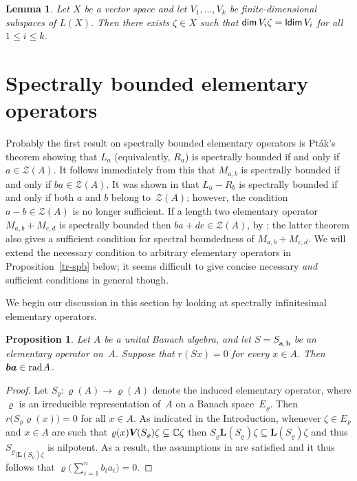 \documentclass[a4paper,12pt,reqno]{amsart}
\numberwithin{equation}{section}
\newtheorem{prop}[thm]{Proposition}
\newtheorem{lem}[thm]{Lemma}
\theoremstyle{definition}
\begin{document}
\begin{lem}\label{free}
Let $X$ be a vector space and let $V_1, \ldots, V_k$ be finite-dimensional subspaces of $L (X)$.
Then there exists $\zeta \in X$ such that ${{\sf dim}\,} V_i \zeta= {{\sf ldim}\,} V_i$ for all $1 \leq i \leq k$.
\end{lem}

\section{Spectrally bounded elementary operators}\label{sect:spbdd}

\noindent
Probably the first result on spectrally bounded elementary operators is Pt\'ak's theorem \cite[Proposition~2.1]{Pta}
showing that $L_a$ (equivalently, $R_a$) is spectrally bounded if and only if $a\in\mathcal Z(A)$.
It follows immediately from this that $M_{a,b}$ is spectrally bounded if and only if $ba\in\mathcal Z(A)$.
It was shown in \cite[Theorem~B]{CuMa} that $L_a-R_b$ is spectrally bounded if and only if both $a$ and $b$
belong to~$\mathcal Z(A)$; however, the condition $a-b\in\mathcal Z(A)$ is no longer sufficient.
If a length two elementary operator $M_{a,b}+M_{c,d}$ is spectrally bounded then $ba+dc\in\mathcal Z(A)$,
by \cite[Theorem~3.5]{NaMa11}; the latter theorem also gives a sufficient condition for spectral boundedness
of $M_{a,b}+M_{c,d}$. We will extend the necessary condition to arbitrary elementary operators in Proposition~\ref{tr-spb}
below; it seems difficult to give concise necessary \textit{and\/} sufficient conditions in general though.

We begin our discussion in this section by looking at spectrally infinitesimal elementary operators.

\begin{prop}\label{prop:infini_elops}
Let $A$ be a unital Banach algebra, and let $S=S_{\bm a,\bm b}$ be an elementary operator on~$A$.
Suppose that $r( Sx)=0$ for every  $x \in A$. Then $\bm b\bm a\in{{\textup{rad}\kern.7pt A}}$.
\end{prop}
\begin{proof}
Let ${S}_\varrho\colon\varrho(A)\to\varrho(A)$ denote the induced elementary operator, where $\varrho$
is an irreducible representation of~$A$ on a Banach space~$E_\varrho$. Then $r\bigr(S_\varrho\varrho(x)\bigl)=0$ for all $x\in A$.
As indicated in the Introduction, whenever $\zeta\in E_\varrho$ and $x\in A$ are such that
$\varrho(x){{\bm V\mkern-2.5mu(S_\varrho)}}\zeta\subseteq{\mathbb{C}}\zeta$ then $S_\varrho{{\bm L(S_\varrho)}}\zeta\subseteq{{\bm L(S_\varrho)}}\zeta$ and thus
${S_\varrho}_{|{{\bm L(S_\varrho)}}\zeta}$ is nilpotent.
As a result, the assumptions in \cite[Proposition~3.1]{NaMa13} are satisfied and it thus follows
that $\varrho\bigl(\sum_{i=1}^n b_i a_i\bigr)=0$.
\end{proof}
\end{document}
